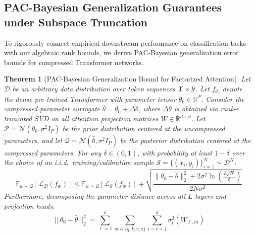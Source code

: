 \documentclass{article}
\newtheorem{theorem}{Theorem}
\begin{document}
\subsection{PAC-Bayesian Generalization Guarantees under Subspace Truncation}
To rigorously connect empirical downstream performance on classification tasks with our algebraic rank bounds, we derive PAC-Bayesian generalization error bounds for compressed Transformer networks.

\begin{theorem}[PAC-Bayesian Generalization Bound for Factorized Attention]
\label{thm:pac_bayes}
Let $\mathcal{D}$ be an arbitrary data distribution over token sequences $\mathcal{X} \times \mathcal{Y}$. Let $f_{\theta_0}$ denote the dense pre-trained Transformer with parameter tensor $\theta_0 \in \mathbb{R}^P$. Consider the compressed parameter surrogate $\hat{\theta} = \theta_0 + \Delta \theta$, where $\Delta \theta$ is obtained via rank-$r$ truncated SVD on all attention projection matrices $W \in \mathbb{R}^{d \times d}$. Let $\mathcal{P} = \mathcal{N}(\theta_0, \sigma^2 I_P)$ be the prior distribution centered at the uncompressed parameters, and let $\mathcal{Q} = \mathcal{N}(\hat{\theta}, \sigma^2 I_P)$ be the posterior distribution centered at the compressed parameters. 
For any $\delta \in (0, 1)$, with probability at least $1 - \delta$ over the choice of an i.i.d.\ training/calibration sample $\mathcal{S} = \{(x_i, y_i)\}_{i=1}^N \sim \mathcal{D}^N$:
\begin{equation}
    \mathbb{E}_{w \sim \mathcal{Q}} \left[ \mathcal{L}_{\mathcal{D}}(f_w) \right] \le \mathbb{E}_{w \sim \mathcal{Q}} \left[ \mathcal{L}_{\mathcal{S}}(f_w) \right] + \sqrt{\frac{\|\theta_0 - \hat{\theta}\|_2^2 + 2 \sigma^2 \ln\left(\frac{2\sqrt{N}}{\delta}\right)}{2 N \sigma^2}}
\end{equation}
Furthermore, decomposing the parameter distance across all $L$ layers and projection heads:
\begin{equation}
    \|\theta_0 - \hat{\theta}\|_2^2 = \sum_{\ell=1}^L \sum_{m \in \{q, k, v, o\}} \sum_{i=r+1}^d \sigma_i^2(W_{\ell, m})
\end{equation}
\end{theorem}
\end{document}
